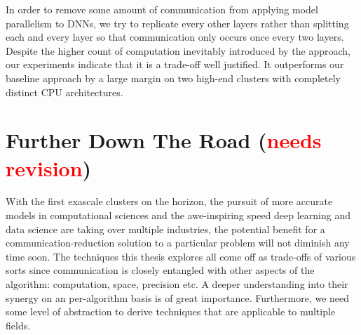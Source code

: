 In order to remove some amount of communication from applying model parallelism 
to DNNs, we try to replicate every other layers rather than splitting each and 
every layer so that communication only occurs once every two layers. Despite the 
higher count of computation inevitably introduced by the approach, our 
experiments indicate that it is a trade-off well justified. It outperforms our 
baseline approach by a large margin on two high-end clusters with completely 
distinct CPU architectures. 

\section{Further Down The Road (\textcolor{red}{needs revision})}
With the first exascale clusters on the horizon, the pursuit of more accurate 
models in computational sciences and the awe-inspiring speed deep learning and 
data science are taking over multiple industries, the potential benefit for a 
communication-reduction solution to a particular problem will not diminish any 
time soon. The techniques this thesis explores all come off as trade-offs of 
various sorts since communication is closely entangled with other aspects of the 
algorithm: computation, space, precision etc. 
A deeper understanding into their synergy on an per-algorithm basis is of great 
importance. Furthermore, we need some level of abstraction to derive techniques 
that are applicable to multiple fields.




